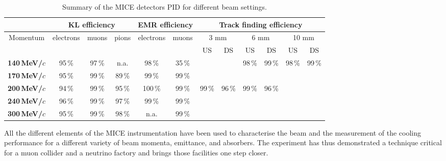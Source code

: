 \begin{table}[htb!]
	\caption{Summary of the MICE detectors PID for different beam settings.}
  \begin{center}
  \begin{tabular}{c|ccc|cc|cc|cc|cc}
  &
  \multicolumn{3}{c|}{\textbf{KL efficiency}} &
  \multicolumn{2}{c|}{\textbf{EMR efficiency}} &
  \multicolumn{6}{c}{\textbf{Track finding efficiency}} \\ 
  \hline
  \multirow{2}{*}{Momentum} &
  \multirow{2}{*}{electrons} &
  \multirow{2}{*}{muons} &
  \multirow{2}{*}{pions} &
  \multirow{2}{*}{electrons} &
  \multirow{2}{*}{muons} &
  \multicolumn{2}{c|}{3 mm} &
  \multicolumn{2}{c|}{6 mm} &
  \multicolumn{2}{c}{10 mm} \\  
             &      &      &      &       &      & US   & DS   & US   & DS   & US   & DS   \\ \hline
\textbf{140\,MeV/$c$} & 95\,\% & 97\,\% & n.a.   & 98\,\%  & 35\,\% &        &      & 98\,\%   & 99\,\% & 98\,\% & 99\,\% \\ \hline
\textbf{170\,MeV/$c$} & 95\,\% & 99\,\% & 89\,\% & 99\,\%  & 99\,\% &        &      &          &        &        &      \\ \hline
\textbf{200\,MeV/$c$} & 94\,\% & 99\,\% & 95\,\% & 100\,\% & 99\,\% & 99\,\% & 96\,\% & 99\,\% & 96\,\% &        &      \\ \hline
\textbf{240\,MeV/$c$} & 96\,\% & 99\,\% & 97\,\% & 99\,\%  & 99\,\% &        &      &          &        &        &      \\ \hline
\textbf{300\,MeV/$c$} & 95\,\% & 99\,\% & 98\,\% & n.a.    & 99\,\% &        &      &          &        &        &     
  \end{tabular}
	\label{tab:pid2}
  \end{center}
\end{table}
All the different elements of the MICE instrumentation have been used to characterise the beam and the measurement of the cooling performance for a different variety of beam momenta, emittance, and absorbers.
The experiment has thus demonstrated a technique critical for a muon collider and a neutrino factory and brings those facilities one step closer.
